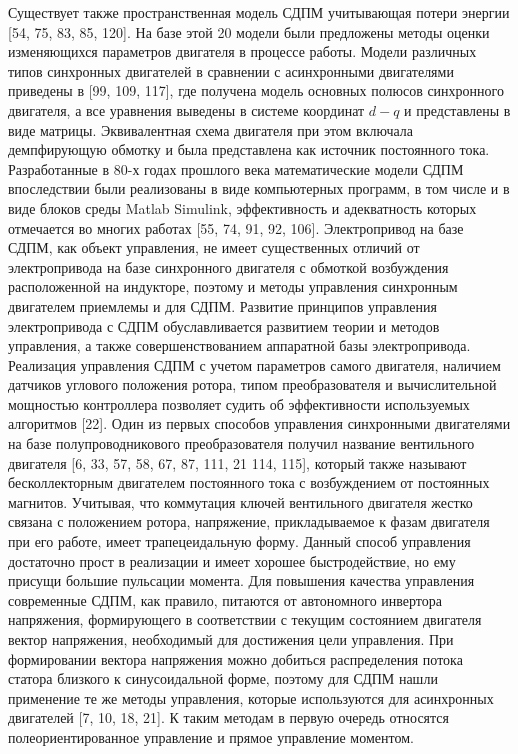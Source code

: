 Существует также пространственная модель СДПМ учитывающая потери энергии [54, 75, 83, 85, 120]. На базе этой 20 модели были предложены методы оценки изменяющихся параметров двигателя в процессе работы. 
Модели различных типов синхронных двигателей в сравнении с асинхронными двигателями приведены в [99, 109, 117], где получена модель основных полюсов синхронного двигателя, а все уравнения выведены в системе координат $d-q$ и представлены в виде матрицы. Эквивалентная схема двигателя при этом включала демпфирующую обмотку и была представлена как источник постоянного тока. 
Разработанные в 80-х годах прошлого века математические модели СДПМ впоследствии были реализованы в виде компьютерных программ, в том числе и в виде блоков среды Matlab Simulink, эффективность и адекватность которых отмечается во многих работах [55, 74, 91, 92, 106]. 
Электропривод на базе СДПМ, как объект управления, не имеет существенных отличий от электропривода на базе синхронного двигателя с обмоткой возбуждения расположенной на индукторе, поэтому и методы управления синхронным двигателем приемлемы и для СДПМ. 
Развитие принципов управления электропривода с СДПМ обуславливается развитием теории и методов управления, а также совершенствованием аппаратной базы электропривода. Реализация управления СДПМ с учетом параметров самого двигателя, наличием датчиков углового положения ротора, типом преобразователя и вычислительной мощностью контроллера позволяет судить об эффективности используемых алгоритмов [22]. 
Один из первых способов управления синхронными двигателями на базе полупроводникового преобразователя получил название вентильного двигателя [6, 33, 57, 58, 67, 87, 111, 21 114, 115], который также называют бесколлекторным двигателем постоянного тока с возбуждением от постоянных магнитов. Учитывая, что коммутация ключей вентильного двигателя жестко связана с положением ротора, напряжение, прикладываемое к фазам двигателя при его работе, имеет трапецеидальную форму. Данный способ управления достаточно прост в реализации и имеет хорошее быстродействие, но ему присущи большие пульсации момента. 
Для повышения качества управления современные СДПМ, как правило, питаются от автономного инвертора напряжения, формирующего в соответствии с текущим состоянием двигателя вектор напряжения, необходимый для достижения цели управления. 
При формировании вектора напряжения можно добиться распределения потока статора близкого к синусоидальной форме, поэтому для СДПМ нашли применение те же методы управления, которые используются для асинхронных двигателей [7, 10, 18, 21]. К таким методам в первую очередь относятся полеориентированное управление и прямое управление моментом. 
